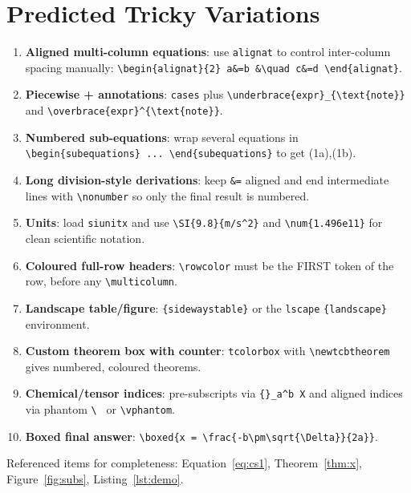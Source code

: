 \documentclass[11pt]{article}
\theoremstyle{plain}
\theoremstyle{definition}
\theoremstyle{remark}
\begin{document}
\section{Predicted Tricky Variations}
\begin{enumerate}[label=\arabic*.]
  \item \textbf{Aligned multi-column equations}: use \texttt{alignat} to
        control inter-column spacing manually:
        \verb|\begin{alignat}{2} a&=b &\quad c&=d \end{alignat}|.
  \item \textbf{Piecewise + annotations}: \texttt{cases} plus
        \verb|\underbrace{expr}_{\text{note}}| and
        \verb|\overbrace{expr}^{\text{note}}|.
  \item \textbf{Numbered sub-equations}: wrap several equations in
        \verb|\begin{subequations} ... \end{subequations}| to get
        (1a),(1b).
  \item \textbf{Long division-style derivations}: keep \verb|&=| aligned
        and end intermediate lines with \verb|\nonumber| so only the
        final result is numbered.
  \item \textbf{Units}: load \texttt{siunitx} and use \verb|\SI{9.8}{m/s^2}|
        and \verb|\num{1.496e11}| for clean scientific notation.
  \item \textbf{Coloured full-row headers}: \verb|\rowcolor| must be the
        FIRST token of the row, before any \verb|\multicolumn|.
  \item \textbf{Landscape table/figure}: \texttt{\{sidewaystable\}} or the
        \texttt{lscape} \verb|{landscape}| environment.
  \item \textbf{Custom theorem box with counter}: \texttt{tcolorbox} with
        \verb|\newtcbtheorem| gives numbered, coloured theorems.
  \item \textbf{Chemical/tensor indices}: pre-subscripts via
        \verb|{}_a^b X| and aligned indices via phantom \verb|\ | or
        \verb|\vphantom|.
  \item \textbf{Boxed final answer}: \verb|\boxed{x = \frac{-b\pm\sqrt{\Delta}}{2a}}|.
\end{enumerate}

Referenced items for completeness: Equation~\eqref{eq:cs1},
Theorem~\ref{thm:x}, Figure~\ref{fig:subs}, Listing~\ref{lst:demo}.
\end{document}
